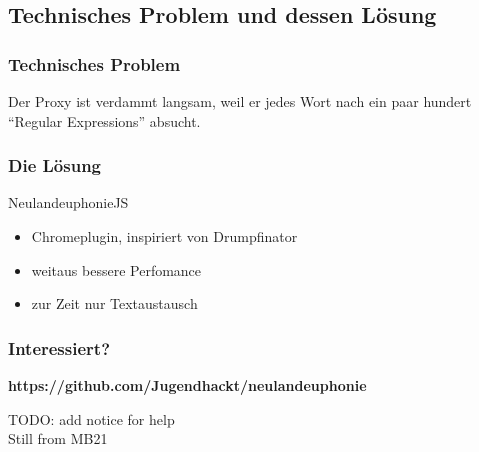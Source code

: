 \documentclass [xcolor=dvipsnames] {beamer}
\begin{document}
\subsection{Technisches Problem und dessen Lösung}
\begin{frame}
	\frametitle{\sc Technisches Problem}
	\begin{center}
		Der Proxy ist verdammt langsam, weil er jedes Wort nach ein paar hundert "`Regular Expressions"' absucht.
	\end{center}
\end{frame}
\begin{frame}
	\frametitle{\sc Die Lösung}
	\begin{center}
		{\Large NeulandeuphonieJS}
	\end{center}
	\begin{itemize}
		\item Chromeplugin, inspiriert von Drumpfinator
		\item weitaus bessere Perfomance
		\item zur Zeit nur Textaustausch
	\end{itemize}
\end{frame}

\begin{frame}
	\frametitle{\sc Interessiert?}
	\begin{center}
		{\bf https://github.com/Jugendhackt/neulandeuphonie}
	\end{center}
\end{frame}
\note
{
	{\Large TODO: add notice for help}
	\\
	Still from MB21
}

\begin{frame}
	\titlepage
\end{frame}
\end{document}
